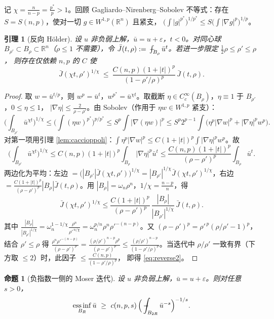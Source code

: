 \documentclass[11pt]{ctexart}
\newcommand{\fint}{\,\rlap{$-$}\!\int}
\newcommand{\R}{\mathbb{R}}
\DeclareMathOperator*{\essinf}{ess\,inf}
\newcommand{\ub}{\bar{u}}
\newcommand{\eps}{\varepsilon}
\theoremstyle{plain}
\newtheorem{lemma}{引理}
\newtheorem{proposition}{命题}
\theoremstyle{definition}
\begin{document}
记 $\chi=\frac{n}{n-p}=\frac{p^*}{p}>1$。回顾 Gagliardo--Nirenberg--Sobolev
不等式：存在 $S=S(n,p)$，使对一切 $g\in W^{1,p}(\R^n)$ 且紧支，
$\big(\int|g|^{p^*}\big)^{1/p^*}\le S\big(\int|\nabla g|^p\big)^{1/p}$。

\begin{lemma}[反向 Hölder]\label{lem:reverse}
设 $u$ 非负弱上解，$\ub=u+\eps$，$t<0$。对同心球 $B_{\rho'}\subset B_\rho
\subset\R^n$（$\rho\le1$ 不需要），令
$\bar J(t,\rho):=\fint_{B_\rho}\ub^{t}$。若进一步限定 $\tfrac12\rho\le\rho'\le\rho$，
则存在仅依赖 $n,p$ 的 $C$ 使
\begin{equation}\label{eq:reverse2}
\bar J(\chi t,\rho')^{1/\chi}\ \le\
\frac{C(n,p)(1+|t|)^p}{(1-\rho'/\rho)^p}\,\bar J(t,\rho).
\end{equation}
\end{lemma}

\begin{proof}
取 $w=\ub^{t/p}$，则 $w^{p}=\ub^{t}$，$w^{p^*}=\ub^{\chi t}$。取截断
$\eta\in C_c^\infty(B_\rho)$，$\eta\equiv1$ 于 $B_{\rho'}$，$0\le\eta\le1$，
$|\nabla\eta|\le\frac{2}{\rho-\rho'}$。由 Sobolev（作用于 $\eta w\in W^{1,p}$
紧支）：
\[
\Big(\int_{B_{\rho'}}\ub^{\chi t}\Big)^{1/\chi}\!\!
\le\Big(\int(\eta w)^{p^*}\Big)^{p/p^*}\!\!
\le S^p\int|\nabla(\eta w)|^p
\le S^p2^{p-1}\!\int\big(\eta^p|\nabla w|^p+|\nabla\eta|^p w^p\big).
\]
对第一项用引理 \ref{lem:caccioppoli}：$\int\eta^p|\nabla w|^p\le
C(1+|t|)^p\int|\nabla\eta|^pw^p$。故
\[
\Big(\int_{B_{\rho'}}\ub^{\chi t}\Big)^{1/\chi}
\le C(n,p)(1+|t|)^p\int_{B_\rho}|\nabla\eta|^p\ub^{t}
\le \frac{C(n,p)(1+|t|)^p}{(\rho-\rho')^p}\int_{B_\rho}\ub^{t}.
\]
两边化为平均：左边
$=\big(|B_{\rho'}|\bar J(\chi t,\rho')\big)^{1/\chi}
=|B_{\rho'}|^{1/\chi}\bar J(\chi t,\rho')^{1/\chi}$，右边
$=\frac{C(1+|t|)^p}{(\rho-\rho')^p}|B_\rho|\bar J(t,\rho)$。用
$|B_\rho|=\omega_n\rho^n$，$1/\chi=\frac{n-p}{n}$，得
\[
\bar J(\chi t,\rho')^{1/\chi}\le
\frac{C(1+|t|)^p}{(\rho-\rho')^p}\,
\frac{|B_\rho|}{|B_{\rho'}|^{1/\chi}}\,\bar J(t,\rho).
\]
其中 $\frac{|B_\rho|}{|B_{\rho'}|^{1/\chi}}
=\omega_n^{1-1/\chi}\frac{\rho^n}{\rho'^{\,n/\chi}}
=\omega_n^{p/n}\rho^{n}\rho'^{-(n-p)}$。又
$(\rho-\rho')^p=\rho'^{\,p}(\rho/\rho'-1)^p$，结合 $\rho'\le\rho$ 得
$\frac{\rho^n\rho'^{-(n-p)}}{(\rho-\rho')^p}
=\frac{(\rho/\rho')^{n-p}\rho^{p}}{(\rho-\rho')^p}
\le\frac{(\rho/\rho')^{n-p}}{(1-\rho'/\rho)^p}$。当迭代中 $\rho/\rho'$
一致有界（下方取 $\le2$）时，此因子 $\le\frac{C(n,p)}{(1-\rho'/\rho)^p}$，
即得 \eqref{eq:reverse2}。
\end{proof}

\begin{proposition}[负指数一侧的 Moser 迭代]\label{prop:mineg}
设 $u$ 非负弱上解，$\ub=u+\eps$。则对任意 $s>0$，
\begin{equation}\label{eq:infbound}
\essinf_{B_R}\ub\ \ge\ c(n,p,s)\,
\Big(\fint_{B_{2R}}\ub^{-s}\Big)^{-1/s}.
\end{equation}
\end{proposition}
\end{document}
